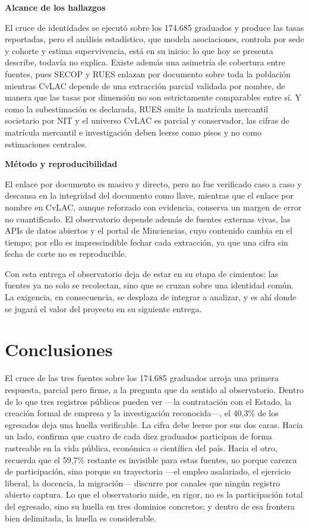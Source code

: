 \begin{cajaobs}
\textbf{Alcance de los hallazgos}

El cruce de identidades se ejecutó sobre los 174.685 graduados y produce las tasas reportadas, pero el análisis estadístico, que modela asociaciones, controla por sede y cohorte y estima supervivencia, está en su inicio: lo que hoy se presenta describe, todavía no explica. Existe además una asimetría de cobertura entre fuentes, pues SECOP y RUES enlazan por documento sobre toda la población mientras CvLAC depende de una extracción parcial validada por nombre, de manera que las tasas por dimensión no son estrictamente comparables entre sí. Y como la subestimación es declarada, RUES omite la matrícula mercantil societario por NIT y el universo CvLAC es parcial y conservador, las cifras de matrícula mercantil e investigación deben leerse como pisos y no como estimaciones centrales.

\textbf{Método y reproducibilidad}

El enlace por documento es masivo y directo, pero no fue verificado caso a caso y descansa en la integridad del documento como llave, mientras que el enlace por nombre en CvLAC, aunque reforzado con evidencia, conserva un margen de error no cuantificado. El observatorio depende además de fuentes externas vivas, las APIs de datos abiertos y el portal de Minciencias, cuyo contenido cambia en el tiempo; por ello es imprescindible fechar cada extracción, ya que una cifra sin fecha de corte no es reproducible.
\end{cajaobs}

Con esta entrega el observatorio deja de estar en su etapa de cimientos: las fuentes ya no solo se recolectan, sino que se cruzan sobre una identidad común. La exigencia, en consecuencia, se desplaza de integrar a analizar, y es ahí donde se jugará el valor del proyecto en su siguiente entrega.

\section{Conclusiones}

El cruce de las tres fuentes sobre los 174.685 graduados arroja una primera respuesta, parcial pero firme, a la pregunta que da sentido al observatorio. Dentro de lo que tres registros públicos pueden ver ---la contratación con el Estado, la creación formal de empresa y la investigación reconocida---, el 40,3\% de los egresados deja una huella verificable. La cifra debe leerse por sus dos caras. Hacia un lado, confirma que cuatro de cada diez graduados participan de forma rastreable en la vida pública, económica o científica del país. Hacia el otro, recuerda que el 59,7\% restante es invisible para estas fuentes, no porque carezca de participación, sino porque su trayectoria ---el empleo asalariado, el ejercicio liberal, la docencia, la migración--- discurre por canales que ningún registro abierto captura. Lo que el observatorio mide, en rigor, no es la participación total del egresado, sino su huella en tres dominios concretos; y dentro de esa frontera bien delimitada, la huella es considerable.

